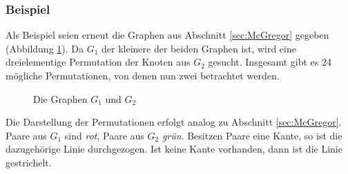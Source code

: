\subsubsection{Beispiel}
Als Beispiel seien erneut die Graphen aus Abschnitt \ref{sec:McGregor} 
gegeben (Abbildung \ref{pic:bsp_Permut_graphs}). Da $G_1$ der kleinere 
der beiden Graphen ist, wird eine dreielementige Permutation der Knoten 
aus $G_2$ gesucht. Insgesamt gibt es 24 mögliche Permutationen, von 
denen nun zwei betrachtet werden.

\begin{figure}[htb]
\centering
\hspace*{\fill}
\hspace*{\fill}
\hspace*{\fill}
\caption{Die Graphen $G_1$ und $G_2$}
\label{pic:bsp_Permut_graphs}
\end{figure}

Die Darstellung der Permutationen erfolgt analog zu Abschnitt \ref{sec:McGregor}. 
Paare aus $G_1$ sind \emph{rot}, Paare aus $G_2$ \emph{grün}. Besitzen Paare eine 
Kante, so ist die dazugehörige Linie durchgezogen. Ist keine Kante vorhanden, dann 
ist die Linie gestrichelt.

%

